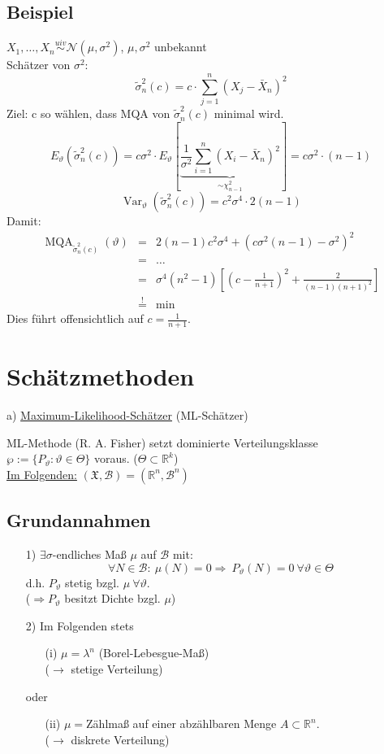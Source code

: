 \documentclass[a4paper,11pt,twoside,titlepage]{article}
\newcommand{\R}{{\mathbb R}}
\newcommand{\XX}{{\mathfrak X}} %
\newcommand\BB{ \mathcal{B} } %
\newcommand\NN{ \mathcal{N} } %
\newcommand{\uiv}{\ensuremath{\stackrel{uiv}{\sim}}}
\DeclareMathOperator{\var}{Var}
\DeclareMathOperator{\MQA}{MQA}
\begin{document}
\subsection{Beispiel}
$X_1,\ldots,X_n\uiv\NN(\mu,\sigma^2)$, $\mu,\sigma^2$ unbekannt\\
Schätzer von $\sigma^2$:
\[\tilde \sigma_n^2(c)=c\cdot\sum_{j=1}^n(X_j-\bar X_n)^2\]
Ziel: c so wählen, dass MQA von $\tilde \sigma_n^2(c)$ minimal wird.
\[E_\vartheta(\tilde\sigma_n^2(c))=c\sigma^2\cdot E_\vartheta[\underbrace{\frac{1}{\sigma^2}\sum_{i=1}^n(X_i-\bar X_n)^2}_{\sim\chi^2_{n-1}}]=c\sigma^2\cdot(n-1)\]
\[\var_\vartheta(\tilde\sigma_n^2(c))=c^2\sigma^4\cdot2(n-1)\]
Damit:
\begin{eqnarray*}
\MQA_{\tilde\sigma_n^2(c)}(\vartheta)&=&2(n-1)c^2\sigma^4+(c\sigma^2(n-1)-\sigma^2)^2\\
&=&\ldots\\
&=&\sigma^4(n^2-1)\left[(c-\frac{1}{n+1})^2+\frac{2}{(n-1)(n+1)^2}\right]\\
&\stackrel{!}{=}&\min\end{eqnarray*}
Dies führt offensichtlich auf $c=\frac{1}{n+1}$.

\cleardoublepage
\section{Schätzmethoden}
a) \underline{Maximum-Likelihood-Schätzer} (ML-Schätzer)

ML-Methode (R. A. Fisher) setzt dominierte Verteilungsklasse\\
$\wp:=\{P_\vartheta:\vartheta\in\Theta\}$ voraus. ($\Theta\subset\R^k$)\\
\underline{Im Folgenden:} $(\XX,\BB)=(\R^n,\BB^n)$

\subsection{Grundannahmen}
\begin{itemize}
\item[1)] $\exists \sigma$-endliches Maß $\mu$ auf $\BB$ mit:
\[\forall N\in\BB:\ \mu(N)=0 \Rightarrow\ P_\vartheta(N)=0\ \forall\vartheta\in\Theta\]
d.h. $P_\vartheta$ stetig bzgl. $\mu\ \forall\vartheta$.\\
($\Rightarrow P_\vartheta$ besitzt Dichte bzgl. $\mu$)
\item[2)] Im Folgenden stets
\begin{itemize}
\item[(i)] $\mu=\lambda^n$ (Borel-Lebesgue-Maß)\\
($\rightarrow$ stetige Verteilung)\end{itemize}
oder
\begin{itemize}
\item[(ii)] $\mu=$Zählmaß auf einer abzählbaren Menge $A\subset\R^n$.\\
($\rightarrow$ diskrete Verteilung)
\end{itemize}
\end{itemize}
\end{document}

